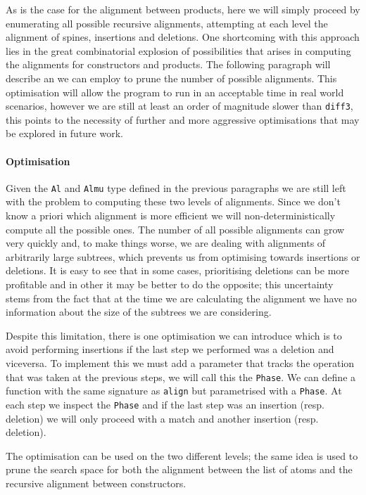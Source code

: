 \documentclass[11pt]{article}
\begin{document}
As is the case for the alignment between products, here we will simply proceed 
by enumerating all possible recursive alignments, attempting at each level 
the alignment of spines, insertions and deletions.
One shortcoming with this approach lies in the great combinatorial 
explosion of possibilities that arises in computing the alignments for 
constructors and products. The following paragraph will describe an  
we can employ to prune the number of possible alignments. This optimisation 
will allow the program to run in an acceptable time in real world scenarios, however 
we are still at least an order of magnitude slower than \texttt{diff3}, this points to 
the necessity of further and more aggressive optimisations that may be explored 
in future work.

\paragraph{Optimisation}\label{optimisations}

Given the \texttt{Al} and \texttt{Almu} type defined in the previous paragraphs we are still left with the problem
to computing these two levels of alignments. Since we don't know a priori which alignment
is more efficient we will non-deterministically compute all the possible ones. The number of all possible alignments  
can grow very quickly and, to make things worse, we are dealing with alignments of arbitrarily large subtrees, which prevents
us from optimising towards insertions or deletions. It is easy to see
that in some cases, prioritising deletions can be more profitable and in
other it may be better to do the opposite; this uncertainty stems from
the fact that at the time we are calculating the alignment we have no
information about the size of the subtrees we are considering.

Despite this limitation, there is one optimisation we can introduce which is to 
avoid performing insertions if the last step we performed was a deletion and
viceversa.
To implement this we must add a parameter that tracks the operation that
was taken at the previous steps, we will call this the \texttt{Phase}. We
can define a function with the same signature as
\texttt{align} but parametrised with a \texttt{Phase}. At each step we inspect 
the \texttt{Phase} and if the last step was an insertion (resp. deletion) we 
will only proceed with a match and another insertion (resp. deletion). 

The optimisation can be used on the two different levels; the same idea is used to prune the search space 
for both the alignment between the list of atoms and the recursive alignment between constructors.
\end{document}
